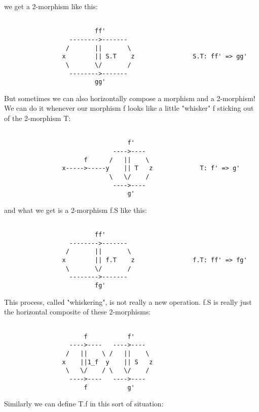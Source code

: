 we get a 2-morphism like this:
 


\begin{verbatim}

                         ff'
                  -------->-------
                 /       ||       \
                x        || S.T    z                S.T: ff' => gg'
                 \       \/       /
                  -------->-------
                         gg'
\end{verbatim}
    
But sometimes we can also horizontally compose a morphism and a
2-morphism!  We can do it whenever our morphism f looks like a little
"whisker" f sticking out of the 2-morphism T:


\begin{verbatim}

                                  f'
                              ---->----  
                      f      /   ||    \              
                x----->-----y    || T   z             T: f' => g'
                             \   \/    /
                              ---->----
                                  g'
\end{verbatim}
    
and what we get is a 2-morphism f.S like this:
 


\begin{verbatim}

                         ff'
                  -------->-------
                 /       ||       \
                x        || f.T    z                f.T: ff' => fg'
                 \       \/       /
                  -------->-------
                         fg'
\end{verbatim}
    
This process, called "whiskering", is not really a new operation.
f.S is really just the horizontal composite of these 2-morphisms:


\begin{verbatim}

                      f           f'
                  ---->----   ---->----  
                 /   ||    \ /   ||    \              
                x    ||1_f  y    || S   z             
                 \   \/    / \   \/    /
                  ---->----   ---->----
                      f           g'
\end{verbatim}
    
Similarly we can define T.f in this sort of situation:


